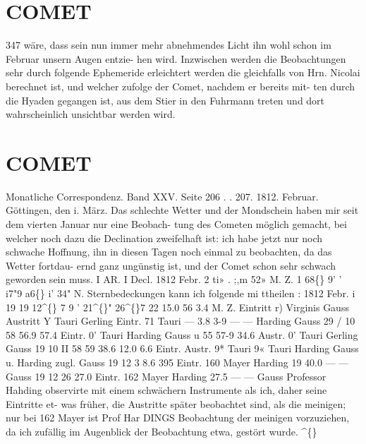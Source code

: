 \documentclass[12pt,a4paper]{article}
\newcommand{\degree}{\textdegree}
\begin{document}
\newpage

\section*{COMET}
347 
wäre,  dass  sein  nun  immer  mehr  abnehmendes  Licht  ihn  wohl  schon  im  Februar  unsern  Augen  entzie- 
hen wird.  Inzwischen  werden  die  Beobachtungen  sehr  durch  folgende  Ephemeride  erleichtert  werden 
die  gleichfalls  von  Hrn.  Nicolai  berechnet  ist,  und  welcher  zufolge  der  Comet,  nachdem  er  bereits  mit- 
ten durch  die  Hyaden  gegangen  ist,  aus  dem  Stier  in  den  Fuhrmann  treten  und  dort  wahrscheinlich 
unsichtbar  werden  wird. 

\section*{COMET}
Monatliche  Correspondenz.    Band  XXV.  Seite  206  . .  207.     1812.  Februar. 
Göttingen,  den  i.  März. 
Das  schlechte  Wetter  und  der  Mondschein  haben  mir  seit  dem  vierten  Januar  nur  eine  Beobach- 
tung des  Cometen  möglich  gemacht,  bei  welcher  noch  dazu  die  Declination  zweifelhaft  ist:  ich  habe  jetzt 
nur  noch  schwache  Hoffnung,  ihn  in  diesen  Tagen  noch  einmal  zu  beobachten,  da  das  Wetter  fortdau- 
ernd ganz  ungünstig  ist,  und  der  Comet  schon  sehr  schwach  geworden  sein  muss. 
I  AR.  I  Decl. 
1812  Febr.  2 
ti»  . 
;,m 
52»  M. 
Z. 
1     68\degree\{\}  9' 
'   i7"9          a6\degree\{\}  i'    34"  N. 
Sternbedeckungen  kann  ich  folgende  mi ttheilen : 
1812  Febr.  i 
19 
19 
12\textasciicircum\{\} 
7 
9 
'    21\textasciicircum\{\}"   26\textasciicircum\{\}7 
22       15.0 
56          3.4 
M.  Z. Eintritt   r)  Virginis  Gauss 
Austritt  Y  Tauri       Gerling 
Eintr.     71  Tauri         --- 
3.8 
3-9 
--- 
--- 
Harding 
Gauss 
29 
/ 
10 
58 
56.9 
57.4 
Eintr. 
0'  Tauri 
Harding 
Gauss 
u 
55 
57-9 
34.6 
Austr. 
0'  Tauri 
Gerling 
Gauss 
19 
10 
II 
58 
59 
38.6 
12.0 
6.6 
Eintr. 
Austr. 
9*  Tauri 
9«  Tauri 
Harding 
Gauss  u.  Harding  zugl. 
Gauss 
19 
12 
3 
8.6 
395 
Eintr. 160  Mayer 
Harding 
19 
40.0 
--- 
--- 
Gauss 
19 
12 
26 
27.0 
Eintr. 162  Mayer 
Harding 
27.5 
--- 
--- 
Gauss 
Professor  Hahding  observirte  mit  einem  schwächern  Instrumente  als  ich,  daher  seine  Eintritte  et- 
was früher,  die  Austritte  später  beobachtet  sind,   als  die  meinigen;    nur  bei  162  Mayer  ist  Prof  Har 
DINGS  Beobachtung   der   meinigen  vorzuziehen,   da  ich  zufällig  im  Augenblick  der   Beobachtung  etwa, 
gestört  wurde.  
\textasciicircum\{\} 
\end{document}
